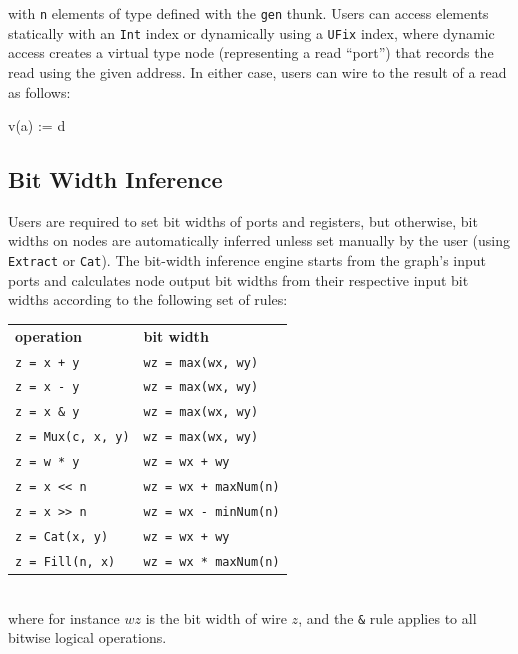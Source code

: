 \documentclass[10pt,twocolumn]{article}
\def\code#1{{\small\tt #1}}
\begin{document}
\noindent
with \code{n} elements of type defined with the \code{gen} thunk.
Users can access elements statically with an \code{Int} index or
dynamically using a \code{UFix} index, 
where dynamic access creates a virtual type node (representing a read
``port'') that records the read using the given address.  In either case,
users can wire to the result of a read as follows:

\begin{scala}
v(a) := d
\end{scala}


\subsection{Bit Width Inference}

Users are required to set bit widths of ports and registers, but otherwise,
bit widths on nodes are automatically inferred unless set manually by
the user (using \code{Extract} or \code{Cat}).
The bit-width inference engine starts from the graph's input ports and 
calculates node output bit widths from their respective input bit widths according to the following set of rules:\\[-2mm]

{\small
\begin{tabular}{ll}
{\bf operation} & {\bf bit width} \\ 
\verb|z = x + y| & \verb+wz = max(wx, wy)+ \\
\verb+z = x - y+ & \verb+wz = max(wx, wy)+\\
\verb+z = x & y+ & \verb+wz = max(wx, wy)+ \\
\verb+z = Mux(c, x, y)+ & \verb+wz = max(wx, wy)+ \\
\verb+z = w * y+ & \verb!wz = wx + wy! \\
\verb+z = x << n+ & \verb!wz = wx + maxNum(n)! \\
\verb+z = x >> n+ & \verb+wz = wx - minNum(n)+ \\
\verb+z = Cat(x, y)+ & \verb!wz = wx + wy! \\
\verb+z = Fill(n, x)+ & \verb+wz = wx * maxNum(n)+ \\
\end{tabular}
}
\\[1mm]
\noindent  
where for instance $wz$ is the bit width of wire $z$, and the \verb+&+
rule applies to all bitwise logical operations.
\end{document}

